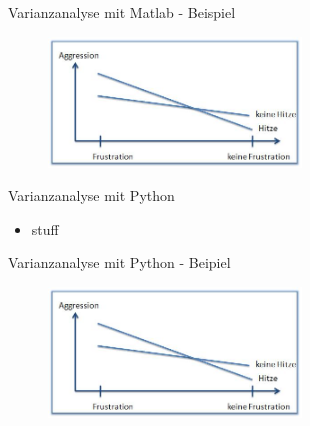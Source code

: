 \documentclass{beamer}
\begin{document}
	
	\begin{frame}{Varianzanalyse mit Matlab - Beispiel}
		\begin{figure}
			\centering
			\includegraphics[width=0.6\textwidth]{Bilder/HybrideInteraktion1.jpg}
		\end{figure}
	\end{frame}
	
	
	\begin{frame}{Varianzanalyse mit Python}
		\begin{itemize}
			\item stuff
		\end{itemize}
	\end{frame}
	
	\begin{frame}{Varianzanalyse mit Python - Beipiel}
		\begin{figure}
			\centering
			\includegraphics[width=0.6\textwidth]{Bilder/HybrideInteraktion1.jpg}
		\end{figure}
	\end{frame}
	
\end{document}
